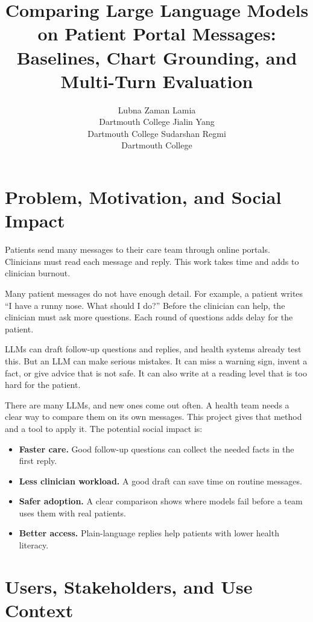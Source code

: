 \documentclass[11pt]{article}
\title{Comparing Large Language Models on Patient Portal Messages:\\
Baselines, Chart Grounding, and Multi-Turn Evaluation}
\author{Lubna Zaman Lamia \\ Dartmouth College \And
  Jialin Yang \\ Dartmouth College \And
  Sudarshan Regmi \\ Dartmouth College}
\begin{document}
\maketitle


\section{Problem, Motivation, and Social Impact}

Patients send many messages to their care team through online portals.
Clinicians must read each message and reply.
This work takes time and adds to clinician burnout.

Many patient messages do not have enough detail.
For example, a patient writes ``I have a runny nose. What should I do?''
Before the clinician can help, the clinician must ask more questions.
Each round of questions adds delay for the patient.

LLMs can draft follow-up questions and replies, and health systems already test this.
But an LLM can make serious mistakes.
It can miss a warning sign, invent a fact, or give advice that is not safe.
It can also write at a reading level that is too hard for the patient.

There are many LLMs, and new ones come out often.
A health team needs a clear way to compare them on its own messages.
This project gives that method and a tool to apply it.
The potential social impact is:
\begin{itemize}
  \item \textbf{Faster care.} Good follow-up questions can collect the needed facts in the first reply.
  \item \textbf{Less clinician workload.} A good draft can save time on routine messages.
  \item \textbf{Safer adoption.} A clear comparison shows where models fail before a team uses them with real patients.
  \item \textbf{Better access.} Plain-language replies help patients with lower health literacy.
\end{itemize}

\section{Users, Stakeholders, and Use Context}
\end{document}
